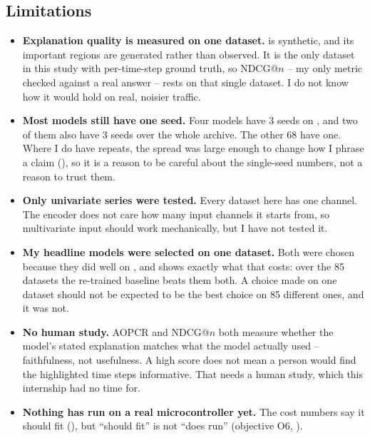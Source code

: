 \subsection{Limitations}
\label{sec:disc:limitations}

\begin{itemize}\itemsep3pt
  \item \textbf{Explanation quality is measured on one dataset.} \webtraffic{} is synthetic, and
        its important regions are generated rather than observed. It is the only dataset in this
        study with per-time-step ground truth, so NDCG@$n$ -- my only metric checked against a real
        answer -- rests on that single dataset. I do not know how it would hold on real, noisier
        traffic.
  \item \textbf{Most models still have one seed.} Four models have 3 seeds on \webtraffic{}, and
        two of them also have 3 seeds over the whole \ucr{} archive. The other 68 have one. Where I
        do have repeats, the spread was large enough to change how I phrase a claim
        (), so it is a reason to be careful about the single-seed numbers,
        not a reason to trust them.
  \item \textbf{Only univariate series were tested.} Every dataset here has one channel. The
        encoder does not care how many input channels it starts from, so multivariate input should
        work mechanically, but I have not tested it.
  \item \textbf{My headline models were selected on one dataset.} Both were chosen because they did
        well on \webtraffic{}, and  shows exactly what that costs: over the 85
        \ucr{} datasets the re-trained baseline beats them both. A choice made on one dataset should
        not be expected to be the best choice on 85 different ones, and it was not.
  \item \textbf{No human study.} AOPCR and NDCG@$n$ both measure whether the model's stated
        explanation matches what the model actually used -- faithfulness, not usefulness. A high
        score does not mean a person would find the highlighted time steps informative. That needs a
        human study, which this internship had no time for.
  \item \textbf{Nothing has run on a real microcontroller yet.} The cost numbers say it should fit
        (), but ``should fit'' is not ``does run'' (objective O6,
        ).
\end{itemize}
